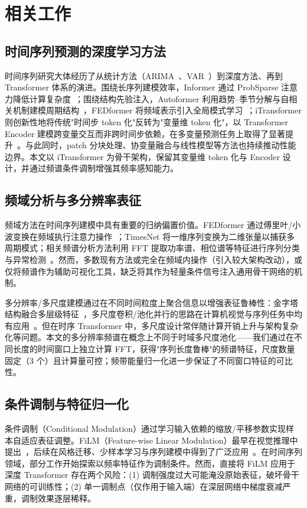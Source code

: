 \section{相关工作}
\label{sec:related_work}

\subsection{时间序列预测的深度学习方法}
时间序列研究大体经历了从统计方法（ARIMA~\cite{arima_survey}、VAR~\cite{var_survey}）到深度方法、再到 Transformer 体系的演进。围绕长序列建模效率，Informer 通过 ProbSparse 注意力降低计算复杂度~\cite{informer}；围绕结构先验注入，Autoformer 利用趋势--季节分解与自相关机制建模周期结构~\cite{autoformer}，FEDformer 将频域表示引入全局模式学习~\cite{fedformer}；iTransformer 则创新性地将传统"时间步 token 化"反转为"变量维 token 化"，以 Transformer Encoder 建模跨变量交互而非跨时间步依赖，在多变量预测任务上取得了显著提升~\cite{itransformer}。与此同时，patch 分块处理、协变量融合与线性模型等方法也持续推动性能边界。本文以 iTransformer 为骨干架构，保留其变量维 token 化与 Encoder 设计，并通过频谱条件调制增强其频率感知能力。

\subsection{频域分析与多分辨率表征}
频域方法在时间序列建模中具有重要的归纳偏置价值。FEDformer 通过傅里叶/小波变换在频域执行注意力操作~\cite{fedformer}；TimesNet 将一维序列变换为二维张量以捕获多周期模式；相关频谱分析方法利用 FFT 提取功率谱、相位谱等特征进行序列分类与异常检测~\cite{fourier_ts}。然而，多数现有方法或完全在频域内操作（引入较大架构改动），或仅将频谱作为辅助可视化工具，缺乏将其作为轻量条件信号注入通用骨干网络的机制。

多分辨率/多尺度建模通过在不同时间粒度上聚合信息以增强表征鲁棒性：金字塔结构融合多层级特征~\cite{ts_pyramid}，多尺度卷积/池化并行的思路在计算机视觉与序列任务中均有应用~\cite{multiscale_ts}。但在时序 Transformer 中，多尺度设计常伴随计算开销上升与架构复杂化等问题。本文的多分辨率频谱在概念上不同于时域多尺度池化——我们通过在不同长度的时间窗口上独立计算 FFT，获得"序列长度鲁棒"的频谱特征，尺度数量固定（3 个）且计算量可控；频带能量归一化进一步保证了不同窗口特征的可比性。

\subsection{条件调制与特征归一化}
条件调制（Conditional Modulation）通过学习输入依赖的缩放/平移参数实现样本自适应表征调整。FiLM（Feature-wise Linear Modulation）最早在视觉推理中提出~\cite{film}，后续在风格迁移、少样本学习与序列建模中得到了广泛应用~\cite{cond_norm,dyn_conv,adaptive_norm_ts}。在时间序列领域，部分工作开始探索以频率特征作为调制条件。然而，直接将 FiLM 应用于深度 Transformer 存在两个风险：(1) 调制强度过大可能淹没原始表征，破坏骨干网络的可训练性；(2) 单一调制点（仅作用于输入端）在深层网络中梯度衰减严重，调制效果逐层稀释。

